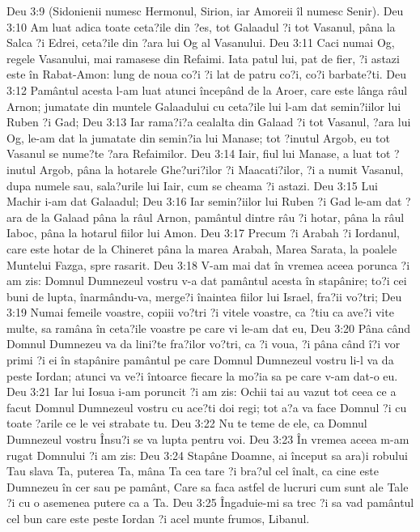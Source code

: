 Deu 3:9  (Sidonienii numesc Hermonul, Sirion, iar Amoreii îl numesc Senir).
Deu 3:10  Am luat adica toate ceta?ile din ?es, tot Galaadul ?i tot Vasanul, pâna la Salca ?i Edrei, ceta?ile din ?ara lui Og al Vasanului.
Deu 3:11  Caci numai Og, regele Vasanului, mai ramasese din Refaimi. Iata patul lui, pat de fier, ?i astazi este în Rabat-Amon: lung de noua co?i ?i lat de patru co?i, co?i barbate?ti.
Deu 3:12  Pamântul acesta l-am luat atunci începând de la Aroer, care este lânga râul Arnon; jumatate din muntele Galaadului cu ceta?ile lui l-am dat semin?iilor lui Ruben ?i Gad;
Deu 3:13  Iar rama?i?a cealalta din Galaad ?i tot Vasanul, ?ara lui Og, le-am dat la jumatate din semin?ia lui Manase; tot ?inutul Argob, eu tot Vasanul se nume?te ?ara Refaimilor.
Deu 3:14  Iair, fiul lui Manase, a luat tot ?inutul Argob, pâna la hotarele Ghe?uri?ilor ?i Maacati?ilor, ?i a numit Vasanul, dupa numele sau, sala?urile lui Iair, cum se cheama ?i astazi.
Deu 3:15  Lui Machir i-am dat Galaadul;
Deu 3:16  Iar semin?iilor lui Ruben ?i Gad le-am dat ?ara de la Galaad pâna la râul Arnon, pamântul dintre râu ?i hotar, pâna la râul Iaboc, pâna la hotarul fiilor lui Amon.
Deu 3:17  Precum ?i Arabah ?i Iordanul, care este hotar de la Chineret pâna la marea Arabah, Marea Sarata, la poalele Muntelui Fazga, spre rasarit.
Deu 3:18  V-am mai dat în vremea aceea porunca ?i am zis: Domnul Dumnezeul vostru v-a dat pamântul acesta în stapânire; to?i cei buni de lupta, înarmându-va, merge?i înaintea fiilor lui Israel, fra?ii vo?tri;
Deu 3:19  Numai femeile voastre, copiii vo?tri ?i vitele voastre, ca ?tiu ca ave?i vite multe, sa ramâna în ceta?ile voastre pe care vi le-am dat eu,
Deu 3:20  Pâna când Domnul Dumnezeu va da lini?te fra?ilor vo?tri, ca ?i voua, ?i pâna când î?i vor primi ?i ei în stapânire pamântul pe care Domnul Dumnezeul vostru li-l va da peste Iordan; atunci va ve?i întoarce fiecare la mo?ia sa pe care v-am dat-o eu.
Deu 3:21  Iar lui Iosua i-am poruncit ?i am zis: Ochii tai au vazut tot ceea ce a facut Domnul Dumnezeul vostru cu ace?ti doi regi; tot a?a va face Domnul ?i cu toate ?arile ce le vei strabate tu.
Deu 3:22  Nu te teme de ele, ca Domnul Dumnezeul vostru Însu?i se va lupta pentru voi.
Deu 3:23  În vremea aceea m-am rugat Domnului ?i am zis:
Deu 3:24  Stapâne Doamne, ai început sa ara)i robului Tau slava Ta, puterea Ta, mâna Ta cea tare ?i bra?ul cel înalt, ca cine este Dumnezeu în cer sau pe pamânt, Care sa faca astfel de lucruri cum sunt ale Tale ?i cu o asemenea putere ca a Ta.
Deu 3:25  Îngaduie-mi sa trec ?i sa vad pamântul cel bun care este peste Iordan ?i acel munte frumos, Libanul.
